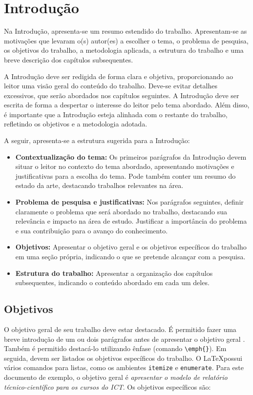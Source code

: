 \chapter{Introdução}\label{cap:introducao}

Na Introdução, apresenta-se um resumo estendido do trabalho. Apresentam-se as motivações que levaram
o(s) autor(es) a escolher o tema, o problema de pesquisa, os objetivos do trabalho, a metodologia aplicada,
a estrutura do trabalho e uma breve descrição dos capítulos subsequentes.

A Introdução deve ser redigida de forma clara e objetiva, proporcionando ao leitor uma visão geral
do conteúdo do trabalho. Deve-se evitar detalhes excessivos, que serão abordados nos capítulos
seguintes. A Introdução deve ser escrita de forma a despertar o interesse do leitor pelo tema abordado.
Além disso, é importante que a Introdução esteja alinhada com o restante do trabalho, refletindo os
objetivos e a metodologia adotada.

A seguir, apresenta-se a estrutura sugerida para a Introdução:
\begin{itemize}
    \item \textbf{Contextualização do tema:} Os primeiros parágrafos da Introdução devem situar o leitor no contexto do tema abordado, apresentando motivações e justificativas para a escolha do tema. Pode também conter um resumo do estado da arte, destacando trabalhos relevantes na área.
    \item \textbf{Problema de pesquisa e justificativas:} Nos parágrafos seguintes, definir claramente o problema que será abordado no trabalho, destacando sua relevância e impacto na área de estudo. Justificar a importância do problema e sua contribuição para o avanço do conhecimento.
    \item \textbf{Objetivos:} Apresentar o objetivo geral e os objetivos específicos do trabalho em uma seção própria, indicando o que se pretende alcançar com a pesquisa.
    \item \textbf{Estrutura do trabalho:} Apresentar a organização dos capítulos subsequentes, indicando o conteúdo abordado em cada um deles.
\end{itemize}

\section{Objetivos}\label{sec:objetivos}

O objetivo geral de seu trabalho deve estar destacado. É permitido fazer uma breve introdução de um ou dois parágrafos antes de apresentar o objetivo geral . Também é permitido destacá-lo utilizando ênfase (comando \verb"\emph{}"). Em seguida, devem ser listados os objetivos específicos do trabalho. O \LaTeX possui vários comandos para listas, como os ambientes \verb"itemize" e \verb"enumerate". Para este documento de exemplo, o objetivo geral é \emph{apresentar o modelo de relatório técnico-científico para os cursos do ICT}. Os objetivos específicos são:

